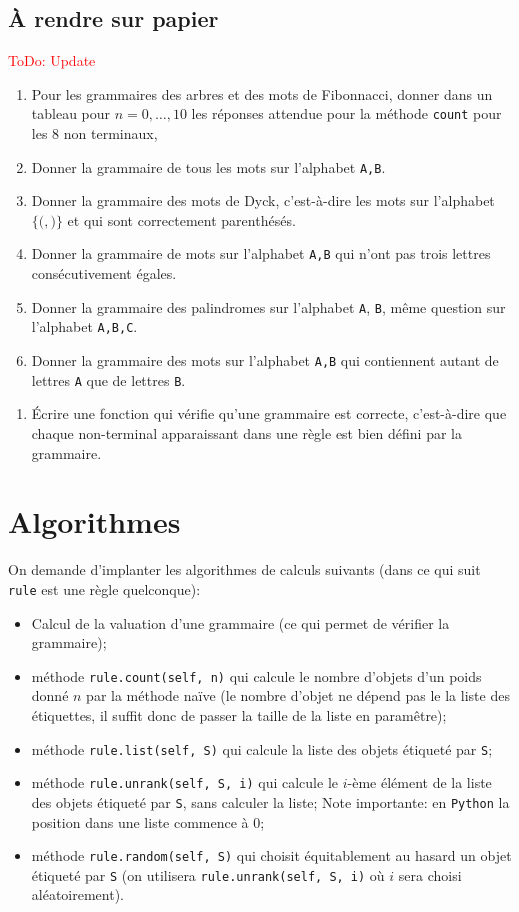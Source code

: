 \documentclass[11pt]{article}
\newcommand\todo[1]{\textcolor{red}{ToDo: #1}}
\newcounter{asuivre}
\newenvironment{ask}{\begin{enumerate}}%
                       {\setcounter{asuivre}{\theenumi}\end{enumerate}}
\newenvironment{asks}{\begin{enumerate}\setcounter{enumi}{\theasuivre}}%
                       {\setcounter{asuivre}{\theenumi}\end{enumerate}}
\newcommand{\Python}{\texttt{Python}}
\begin{document}
\subsection{À rendre sur papier}
\todo{Update}
\begin{ask}
\item Pour les grammaires des arbres et des mots de Fibonnacci, donner dans un
  tableau pour $n=0,\dots,10$ les réponses attendue pour la méthode
  \texttt{count} pour les $8$ non terminaux,
\item Donner la grammaire de tous les mots sur l'alphabet \texttt{A,B}.
\item Donner la grammaire des mots de Dyck, c'est-à-dire les mots sur
  l'alphabet $\{\texttt{(}, \texttt{)}\}$ et qui sont correctement
  parenthésés.
\item Donner la grammaire de mots sur l'alphabet \texttt{A,B} qui n'ont pas
  trois lettres consécutivement égales.
\item Donner la grammaire des palindromes sur l'alphabet \texttt{A},
  \texttt{B}, même question sur l'alphabet \texttt{A,B,C}.
\item Donner la grammaire des mots sur l'alphabet \texttt{A,B} qui
  contiennent autant de lettres \texttt{A} que de lettres \texttt{B}.
\end{ask}

\begin{asks}
\item Écrire une fonction qui vérifie qu'une grammaire est correcte,
  c'est-à-dire que chaque non-terminal apparaissant dans une règle est bien
  défini par la grammaire.
\end{asks}



\section{Algorithmes}

On demande d'implanter les algorithmes de calculs suivants (dans ce qui suit
\texttt{rule} est une règle quelconque):
\begin{itemize}
\item Calcul de la valuation d'une grammaire (ce qui permet de vérifier la
  grammaire);
\item méthode \verb+rule.count(self, n)+ qui calcule le nombre d'objets d'un
  poids donné $n$ par la méthode naïve (le nombre d'objet ne dépend pas le la
  liste des étiquettes, il suffit donc de passer la taille de la liste en
  paramêtre);
\item méthode \verb+rule.list(self, S)+ qui calcule la liste des objets
  étiqueté par \verb+S+;
\item méthode \verb+rule.unrank(self, S, i)+ qui calcule le $i$-ème élément de
  la liste des objets étiqueté par \verb+S+, sans calculer la liste; Note importante:
  en \Python{} la position dans une liste commence à $0$;
\item méthode \verb+rule.random(self, S)+ qui choisit équitablement au hasard
  un objet étiqueté par \verb+S+ (on utilisera \verb+rule.unrank(self, S, i)+ où $i$
  sera choisi aléatoirement).
\end{itemize}
\end{document}

